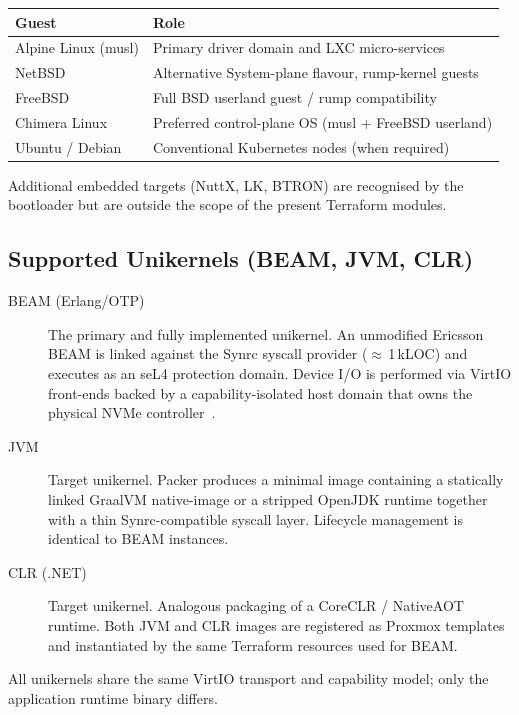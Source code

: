 \documentclass{article}
\begin{document}
\begin{center}
\begin{tabular}{lp{7.5cm}}
\toprule
\textbf{Guest} & \textbf{Role} \\
\midrule
Alpine Linux (musl) & Primary driver domain and LXC micro-services \\
NetBSD              & Alternative System-plane flavour, rump-kernel guests \\
FreeBSD             & Full BSD userland guest / rump compatibility \\
Chimera Linux       & Preferred control-plane OS (musl + FreeBSD userland) \\
Ubuntu / Debian     & Conventional Kubernetes nodes (when required) \\
\bottomrule
\end{tabular}
\end{center}

Additional embedded targets (NuttX, LK, BTRON) are recognised by the bootloader but are outside the scope of the present Terraform modules.

\subsection{Supported Unikernels (BEAM, JVM, CLR)}

\begin{description}
  \item[BEAM (Erlang/OTP)] The primary and fully implemented unikernel. An unmodified Ericsson BEAM is linked against the Synrc syscall provider ($\approx$\,1\,kLOC) and executes as an seL4 protection domain. Device I/O is performed via VirtIO front-ends backed by a capability-isolated host domain that owns the physical NVMe controller~\cite{virtio-md}.
  \item[JVM] Target unikernel. Packer produces a minimal image containing a statically linked GraalVM native-image or a stripped OpenJDK runtime together with a thin Synrc-compatible syscall layer. Lifecycle management is identical to BEAM instances.
  \item[CLR (.NET)] Target unikernel. Analogous packaging of a CoreCLR / NativeAOT runtime. Both JVM and CLR images are registered as Proxmox templates and instantiated by the same Terraform resources used for BEAM.
\end{description}

All unikernels share the same VirtIO transport and capability model; only the application runtime binary differs.
\end{document}
